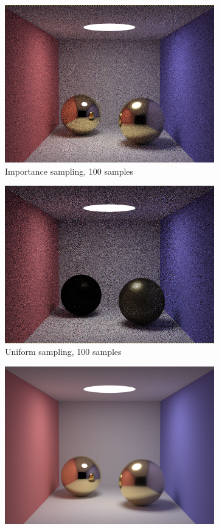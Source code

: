 \documentclass[12pt]{article}
\begin{document}
\begin{figure}
  \centering
  \begin{subfigure}{.5\textwidth}
    \centering
    \includegraphics[width=.9\linewidth]{IS100.png}
    \caption{Importance sampling, 100 samples}
    \label{result_is100}
  \end{subfigure}%
  \begin{subfigure}{.5\textwidth}
    \centering
    \includegraphics[width=.9\linewidth]{DS100.png}
    \caption{Uniform sampling, 100 samples}
    \label{result_us100}
  \end{subfigure}
  \begin{subfigure}{.5\textwidth}
    \centering
    \includegraphics[width=.9\linewidth]{convergedIS.png}

\end{subfigure}
\end{figure}
\end{document}
